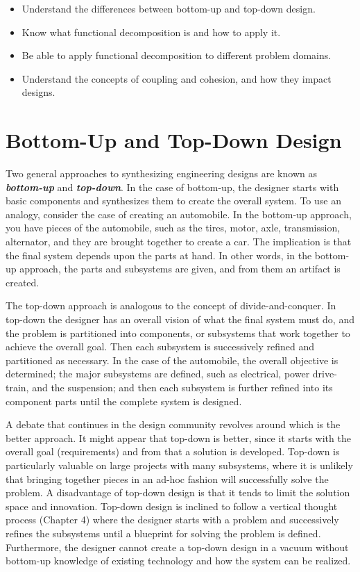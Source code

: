 \begin{itemize}
\item
  Understand the differences between bottom-up and top-down design.
\item
  Know what functional decomposition is and how to apply it.
\item
  Be able to apply functional decomposition to different problem
  domains.
\item
  Understand the concepts of coupling and cohesion, and how they impact
  designs.
\end{itemize}

\section{Bottom-Up and Top-Down Design}
\label{section:bottom-up-and-top-down-design}

Two general approaches to synthesizing engineering designs are known as
\emph{\textbf{bottom-up}} and \emph{\textbf{top-down}}. In the case of
bottom-up, the designer starts with basic components and synthe­sizes
them to create the overall system. To use an analogy, consider the case
of creating an automobile. In the bottom-up approach, you have pieces of
the automobile, such as the tires, motor, axle, transmission,
alternator, and they are brought together to create a car. The
impli­cation is that the final system depends upon the parts at hand. In
other words, in the bottom-up approach, the parts and subsystems are
given, and from them an artifact is created.

The top-down approach is analogous to the concept of divide-and-conquer.
In top-down the designer has an overall vision of what the final system
must do, and the problem is parti­tioned into components, or subsystems
that work together to achieve the overall goal. Then each subsystem is
successively refined and partitioned as necessary. In the case of the
auto­mobile, the overall objective is determined; the major subsystems
are defined, such as electri­cal, power drive-train, and the suspension;
and then each subsystem is further refined into its component parts
until the complete system is designed.

A debate that continues in the design community revolves around which is
the better ap­proach. It might appear that top-down is better, since it
starts with the over­all goal (requirements) and from that a solution is
developed. Top-down is particularly valu­able on large projects with many
subsystems, where it is unlikely that bringing together pieces in an
ad-hoc fashion will successfully solve the problem. A disadvantage of
top-down design is that it tends to limit the solution space and
innovation. Top-down design is inclined to follow a vertical thought
process (Chapter 4) where the designer starts with a problem and
succes­sively refines the subsystems until a blueprint for solving the
problem is defined. Further­more, the designer cannot create a top-down
design in a vacuum without bottom-up knowl­edge of existing technology
and how the system can be realized.

